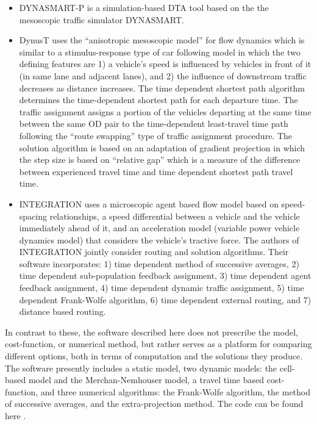 \begin{itemize}
\item DYNASMART-P \cite{DYNASMART,mahmassani2004dynasmart} is a simulation-based DTA tool based on the the mesoscopic traffic simulator DYNASMART. 
\item DynusT \cite{chiu2011dynust} uses the “anisotropic mesoscopic model” for flow dynamics which is similar to a stimulus-response type of car following model in which the two defining features are 1) a vehicle’s speed is influenced by vehicles in front of it (in same lane and adjacent lanes), and 2) the influence of downstream traffic decreases as distance increases. The time dependent shortest path algorithm determines the time-dependent shortest path for each departure time. The traffic assignment assigns a portion of the vehicles departing at the same time between the same OD pair to the time-dependent least-travel time path following the “route swapping” type of traffic assignment procedure. The solution algorithm is based on an adaptation of gradient projection in which the step size is based on “relative gap” which is a measure of the difference between experienced travel time and time dependent shortest path travel time. 
\item INTEGRATION \cite{rakha2012integration} uses a microscopic agent based flow model based on speed-spacing relationships, a speed differential between a vehicle and the vehicle immediately ahead of it, and an acceleration model (variable power vehicle dynamics model) that considers the vehicle’s tractive force. The authors of INTEGRATION jointly consider routing and solution algorithms. Their software incorporates: 1) time dependent method of successive averages, 2) time dependent sub-population feedback assignment, 3) time dependent agent feedback assignment, 4) time dependent dynamic traffic assignment, 5) time dependent Frank-Wolfe algorithm, 6) time dependent external routing, and 7) distance based routing.  

\end{itemize}

In contrast to these, the software described here does not prescribe the model, cost-function, or numerical method, but rather serves as a platform for comparing different options, both in terms of computation and the solutions they produce. The software presently includes a static model, two dynamic models: the cell-based model and the Merchan-Nemhouser model, a travel time based cost-function, and three numerical algorithms: the Frank-Wolfe algorithm, the method of successive averages, and the extra-projection method. The code can be found here \cite{ta_solver}. 


